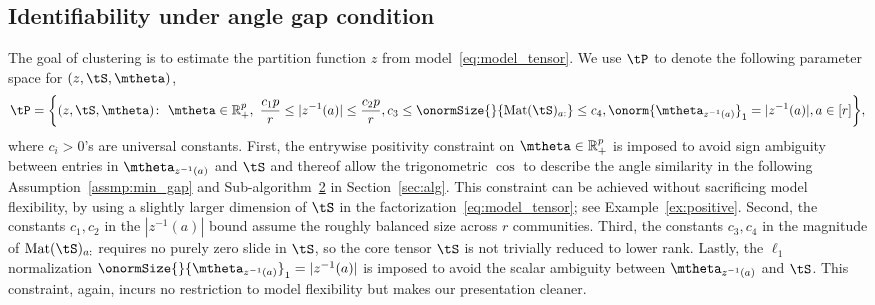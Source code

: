 \documentclass[lettersize,onecolumn,journal]{IEEEtran}
\theoremstyle{definition}
\theoremstyle{definition}
\newtheorem{example}{Example}
\begin{document}

\subsection{Identifiability under angle gap condition}
The goal of clustering is to estimate the partition function $z$ from model~\eqref{eq:model_tensor}. We use $\tP$ to denote the following parameter space for $(z,\tS,\mtheta)$,
\begin{align}\label{eq:family}
\tP=\bigg\{(z,\tS,\mtheta)\colon  \ \mtheta\in\mathbb{R}^p_{+},\ 
{c_1p\over r}\leq |z^{-1}(a)|\leq {c_2 p\over r}, c_3\leq \onormSize{}{\text{Mat}(\tS)_{a:}}\leq c_4, \onorm{\mtheta_{z^{-1}(a)}}_1=|z^{-1}(a)|, a\in[r]\bigg\},
\end{align}
\normalsize
where $c_i>0$'s are universal constants.  
First, the entrywise positivity constraint on  $\mtheta\in\mathbb{R}^p_{+}$ is imposed to avoid sign ambiguity between entries in $\mtheta_{z^{-1}(a)}$ and $\tS$ {\color{blue} and thereof allow the trigonometric $\cos$ to describe the angle similarity in the following Assumption~\ref{assmp:min_gap} and Sub-algorithm~\hyperref[alg:main]{2} in Section~\ref{sec:alg}}. This constraint can be achieved without sacrificing model flexibility, by using a slightly larger dimension of $\tS$ in the factorization~\eqref{eq:model_tensor}; see Example~\ref{ex:positive}. Second, 
the constants $c_1, c_2$ in the $|z^{-1}(a)|$ bound assume the roughly balanced size across $r$ communities. Third, the constants $c_3, c_4 $ in the magnitude of $\text{Mat}(\tS)_{a:}$ requires no purely zero slide in $\tS$, so the core tensor $\tS$ is not trivially reduced to lower rank. Lastly, the $\ell_1$ normalization $\onormSize{}{\mtheta_{z^{-1}(a)}}_1=|z^{-1}(a)|$ is imposed to avoid the scalar ambiguity between $\mtheta_{z^{-1}(a)}$ and $\tS$. This constraint, again, incurs no restriction to model flexibility but makes our presentation cleaner. 
\end{document}
